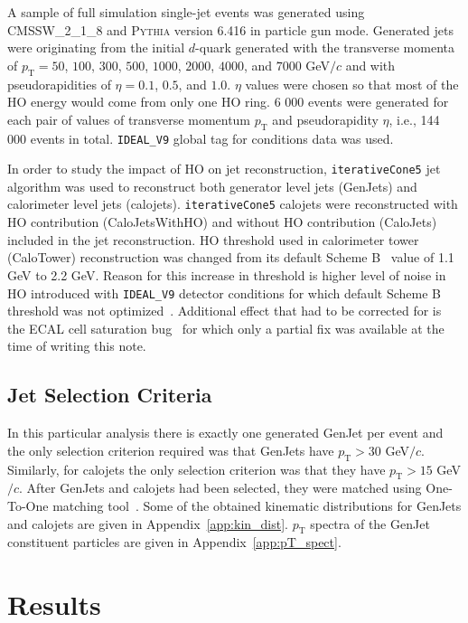 \documentclass{cmspaper}
\begin{document}
A sample of full simulation single-jet events was generated using CMSSW\_2\_1\_8 and P\textsc{ythia} version 6.416 in particle gun mode. Generated jets were originating from the initial $d$-quark generated with the transverse momenta of $p_\mathrm{T}=50$, $100$, $300$, $500$, $1000$, $2000$, $4000$, and $7000$ GeV$/c$ and with pseudorapidities of $\eta=0.1$, $0.5$, and $1.0$. $\eta$ values were chosen so that most of the HO energy would come from only one HO ring. 6 000 events were generated for each pair of values of transverse momentum $p_\mathrm{T}$ and pseudorapidity $\eta$, i.e., 144 000 events in total. \texttt{IDEAL\_V9} global tag for conditions data was used. 

In order to study the impact of HO on jet reconstruction, \texttt{iterativeCone5} jet algorithm was used to reconstruct both generator level jets (GenJets) and calorimeter level jets (calojets). \texttt{iterativeCone5} calojets were reconstructed with HO contribution (CaloJetsWithHO) and without HO contribution (CaloJets) included in the jet reconstruction. HO threshold used in calorimeter tower (CaloTower) reconstruction was changed from its default Scheme B~\cite{ref:scheme_b} value of 1.1 GeV to 2.2 GeV. Reason for this increase in threshold is higher level of noise in HO introduced with \texttt{IDEAL\_V9} detector conditions for which default Scheme B threshold was not optimized~\cite{ref:thresh}. Additional effect that had to be corrected for is the ECAL cell saturation bug~\cite{ref:ecal_cell} for which only a partial fix was available at the time of writing this note.

\subsection{Jet Selection Criteria}

In this particular analysis there is exactly one generated GenJet per event and the only selection criterion required was that GenJets have $p_\mathrm{T}>30$ GeV$/c$. Similarly, for calojets the only selection criterion was that they have $p_\mathrm{T}>15$ GeV$/c$. After GenJets and calojets had been selected, they were matched using One-To-One matching tool~\cite{ref:one_to_one}. Some of the obtained kinematic distributions for GenJets and calojets are given in Appendix~\ref{app:kin_dist}. $p_\mathrm{T}$ spectra of the GenJet constituent particles are given in Appendix~\ref{app:pT_spect}.


\section{Results}
\label{sc:results}
\end{document}
